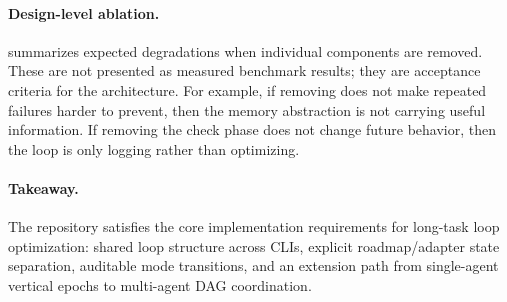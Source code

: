 \paragraph{Design-level ablation.}
 summarizes expected degradations when individual components are removed. These are not presented as measured benchmark results; they are acceptance criteria for the architecture. For example, if removing \failurebank{} does not make repeated failures harder to prevent, then the memory abstraction is not carrying useful information. If removing the check phase does not change future behavior, then the loop is only logging rather than optimizing.

\paragraph{Takeaway.}
The repository satisfies the core implementation requirements for long-task loop optimization: shared loop structure across CLIs, explicit roadmap/adapter state separation, auditable mode transitions, and an extension path from single-agent vertical epochs to multi-agent DAG coordination.
